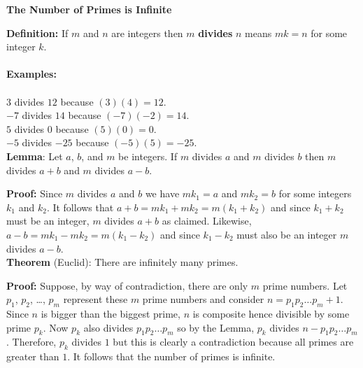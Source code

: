 \documentclass[12pt]{article}
\begin{document}
\begin{center}
\textbf{{\Large The Number of Primes is Infinite}}
\end{center}
\textbf{Definition:} If $m$ and $n$ are integers then 
$m$ \textbf{divides} $n$ means $mk=n$ for some
integer $k$.\\\\
\textbf{Examples:} \\\\
$3$ divides $12$ because $(3)(4)=12$.\\
$-7$ divides $14$ because $(-7)(-2)=14$.\\
$5$ divides $0$ because $(5)(0)=0$.\\
$-5$ divides $-25$ because $(-5)(5)=-25$.\\

\noindent\textbf{Lemma}: Let $a$, $b$, and $m$ be 
integers. If $m$ divides $a$ and $m$ divides $b$ then 
$m$ divides $a+b$ and $m$ divides $a-b$.

\noindent\textbf{Proof:} Since $m$ divides $a$ and 
$b$ we have $mk_1=a$ and $mk_2=b$ for some integers
$k_1$ and $k_2$. It follows that $a+b=mk_1+mk_2
=m(k_1+k_2)$ and since $k_1+k_2$ must be an integer, 
$m$ divides $a+b$ as claimed. Likewise, 
$a-b=mk_1-mk_2=m(k_1-k_2)$ and since $k_1-k_2$ must also
be an integer $m$ divides $a-b$.\\

\noindent\textbf{Theorem} (Euclid): There are infinitely 
many primes.

\noindent\textbf{Proof:} Suppose, by way of contradiction, 
there are only $m$ prime numbers. Let 
$p_1$, $p_2$, \ldots, $p_m$ represent these $m$ prime 
numbers and consider $n=p_1p_2 \ldots p_m+1$. 
Since $n$ is bigger than the biggest prime, $n$ is composite 
hence divisible by some prime $p_k$. Now $p_k$ also
divides $p_1p_2 \ldots p_m$ so by the Lemma, $p_k$
divides $n-p_1p_2 \ldots p_m$. Therefore, $p_k$ divides
$1$ but this is clearly a contradiction because all primes
are greater than $1$. It follows that the number of primes
is infinite.
\end{document}
